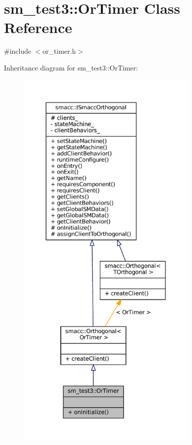 \hypertarget{classsm__test3_1_1OrTimer}{}\section{sm\+\_\+test3\+:\+:Or\+Timer Class Reference}
\label{classsm__test3_1_1OrTimer}


{\ttfamily \#include $<$or\+\_\+timer.\+h$>$}



Inheritance diagram for sm\+\_\+test3\+:\+:Or\+Timer\+:
\nopagebreak
\begin{figure}[H]
\begin{center}
\leavevmode
\includegraphics[height=550pt]{classsm__test3_1_1OrTimer__inherit__graph}
\end{center}
\end{figure}


